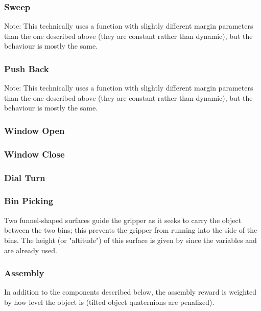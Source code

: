 {\subsubsection{Sweep}
Note: This technically uses a  function with slightly different margin parameters than the one described above (they are constant rather than dynamic), but the behaviour is mostly the same.


\subsubsection{Push Back}
Note: This technically uses a  function with slightly different margin parameters than the one described above (they are constant rather than dynamic), but the behaviour is mostly the same.



\subsubsection{Window Open}


\subsubsection{Window Close}


\subsubsection{Dial Turn}


\subsubsection{Bin Picking}
Two funnel-shaped surfaces guide the gripper as it seeks to carry the object between the two bins; this prevents the gripper from running into the side of the bins. The height (or "altitude") of this surface is given by  since the variables  and  are already used.




\subsubsection{Assembly}
In addition to the components described below, the assembly reward is weighted by how level the object is (tilted object quaternions are penalized).







}
